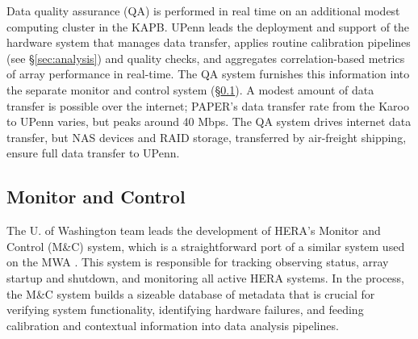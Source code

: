 \documentclass[ars]{copernicus}
\begin{document}
Data quality assurance (QA) is performed in real time on an additional modest 
computing cluster in the
KAPB.  UPenn leads the deployment and support of the hardware system that
manages data transfer, applies routine calibration pipelines (see \S\ref{sec:analysis}) and quality
checks, and aggregates correlation-based metrics of array performance in real-time.  The QA system
furnishes this information into the separate monitor and control system (\S\ref{sec:monitor}).
A modest amount of data transfer is possible over the internet; PAPER's data transfer rate from the Karoo
to UPenn varies, but peaks around 40 Mbps.  The QA system drives internet data transfer, but
NAS devices and RAID storage, transferred by air-freight shipping, ensure full data transfer to UPenn.




\subsection{Monitor and Control}
\label{sec:monitor}

The U. of Washington team leads the development of HERA's Monitor and Control (M\&C) system,
which is a straightforward port of a similar system used on the MWA \citep{tingay_et_al2013}.
This system is
responsible for tracking observing status, array startup and shutdown, and
monitoring all active HERA systems. In the process, the M\&C system builds a sizeable database of 
metadata that is crucial for verifying system functionality, identifying hardware failures, and feeding
calibration and contextual information into data analysis pipelines.  
\end{document}
